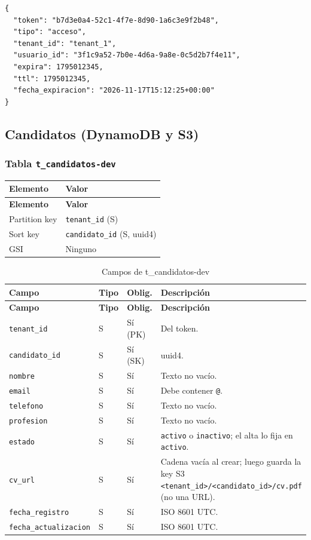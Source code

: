 \begin{lstlisting}
{
  "token": "b7d3e0a4-52c1-4f7e-8d90-1a6c3e9f2b48",
  "tipo": "acceso",
  "tenant_id": "tenant_1",
  "usuario_id": "3f1c9a52-7b0e-4d6a-9a8e-0c5d2b7f4e11",
  "expira": 1795012345,
  "ttl": 1795012345,
  "fecha_expiracion": "2026-11-17T15:12:25+00:00"
}
\end{lstlisting}

\subsection{Candidatos (DynamoDB y S3)}
\subsubsection{Tabla \texttt{t\_candidatos-dev}}
\begin{longtable}{p{3.5cm}p{10.5cm}}
\toprule
\textbf{Elemento} & \textbf{Valor} \\
\midrule
\endfirsthead
\toprule
\textbf{Elemento} & \textbf{Valor} \\
\midrule
\endhead
\bottomrule
\endlastfoot
Partition key & \texttt{tenant\_\allowbreak{}id} (S) \\
Sort key & \texttt{candidato\_\allowbreak{}id} (S, uuid4) \\
GSI & Ninguno \\
\end{longtable}

\begin{longtable}{p{3.4cm}p{1.2cm}p{1.4cm}p{8cm}}
\caption{Campos de t\_candidatos-dev}\\
\toprule
\textbf{Campo} & \textbf{Tipo} & \textbf{Oblig.} & \textbf{Descripción} \\
\midrule
\endfirsthead
\toprule
\textbf{Campo} & \textbf{Tipo} & \textbf{Oblig.} & \textbf{Descripción} \\
\midrule
\endhead
\bottomrule
\endlastfoot
\texttt{tenant\_\allowbreak{}id} & S & Sí (PK) & Del token. \\
\texttt{candidato\_\allowbreak{}id} & S & Sí (SK) & uuid4. \\
\texttt{nombre} & S & Sí & Texto no vacío. \\
\texttt{email} & S & Sí & Debe contener \texttt{@}. \\
\texttt{telefono} & S & Sí & Texto no vacío. \\
\texttt{profesion} & S & Sí & Texto no vacío. \\
\texttt{estado} & S & Sí & \texttt{activo} o \texttt{inactivo}; el alta lo fija en \texttt{activo}. \\
\texttt{cv\_\allowbreak{}url} & S & Sí & Cadena vacía al crear; luego guarda la key S3 \texttt{\textless{}tenant\_\allowbreak{}id\textgreater{}/\textless{}candidato\_\allowbreak{}id\textgreater{}/cv.pdf} (no una URL). \\
\texttt{fecha\_\allowbreak{}registro} & S & Sí & ISO 8601 UTC. \\
\texttt{fecha\_\allowbreak{}actualizacion} & S & Sí & ISO 8601 UTC. \\
\end{longtable}

